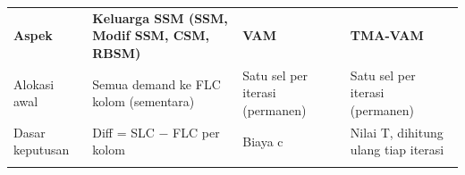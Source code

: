 \documentclass[10pt,a4paper]{article}
\newcounter{none}
\begin{document}
{\def\LTcaptype{none} %
\begin{longtable}[]{@{}
  >{\raggedright\arraybackslash}p{}
  >{\raggedright\arraybackslash}p{}
  >{\raggedright\arraybackslash}p{}
  >{\raggedright\arraybackslash}p{}@{}}
\toprule\noalign{}
\begin{minipage}[b]{\linewidth}\raggedright
\textbf{Aspek}
\end{minipage} & \begin{minipage}[b]{\linewidth}\centering
\textbf{Keluarga SSM (SSM, Modif SSM, CSM, RBSM)}
\end{minipage} & \begin{minipage}[b]{\linewidth}\centering
\textbf{VAM}
\end{minipage} & \begin{minipage}[b]{\linewidth}\centering
\textbf{TMA-VAM}
\end{minipage} \\
\begin{minipage}[b]{\linewidth}\raggedright
Alokasi awal
\end{minipage} & \begin{minipage}[b]{\linewidth}\centering
Semua demand ke FLC kolom (sementara)
\end{minipage} & \begin{minipage}[b]{\linewidth}\centering
Satu sel per iterasi (permanen)
\end{minipage} & \begin{minipage}[b]{\linewidth}\centering
Satu sel per iterasi (permanen)
\end{minipage} \\
\begin{minipage}[b]{\linewidth}\raggedright
Dasar keputusan
\end{minipage} & \begin{minipage}[b]{\linewidth}\centering
Diff = SLC − FLC per kolom
\end{minipage} & \begin{minipage}[b]{\linewidth}\centering
Biaya c
\end{minipage} & \begin{minipage}[b]{\linewidth}\centering
Nilai T, dihitung ulang tiap iterasi
\end{minipage} \\
\begin{minipage}[b]{\linewidth}\raggedright

\end{minipage}
\end{longtable}}
\end{document}
